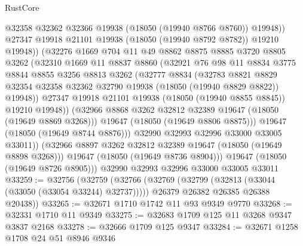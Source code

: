 \begin{lexlean}{RustCore}
\begin{coremodule}
                      @32358
                      @32362
                      @32366
                      @19938
                      (@18050 (@19940 @8766 @8760))
                      @19948))
                  @27347
                  @19918
                  @21101
                  @19938
                  (@18050 (@19940 @8792 @8782))
                  @19210
                  @19948))
              (@32276
                @1669
                @704
                @11
                @49
                @8862
                @8875
                @8885
                @3720
                @8805
                @3262
                (@32310
                  @1669
                  @11
                  @8837
                  @8860
                  (@32921
                    @76
                    @98
                    @11
                    @8834
                    @3775
                    @8844
                    @8855
                    @3256
                    @8813
                    @3262
                    (@32777
                      @8834
                      (@32783
                        @8821
                        @8829
                        @32354
                        @32358
                        @32362
                        @32790
                        @19938
                        (@18050 (@19940 @8829 @8822))
                        @19948))
                    @27347
                    @19918
                    @21101
                    @19938
                    (@18050 (@19940 @8855 @8845))
                    @19210
                    @19948))
                (@32966 @8868 @3262 @32812 @32389 @19647 (@18050 (@19649 @8869 @3268)))
                @19647
                (@18050 (@19649 @8806 @8875)))
              @19647
              (@18050 (@19649 @8744 @8876)))
            @32990
            @32993
            @32996
            @33000
            @33005
            @33011))
        (@32966 @8897 @3262 @32812 @32389 @19647 (@18050 (@19649 @8898 @3268)))
        @19647
        (@18050 (@19649 @8736 @8904)))
      @19647
      (@18050 (@19649 @8726 @8905)))
    @32990
    @32993
    @32996
    @33000
    @33005
    @33011
@33259 := @32756
    (@32759
      (@32766
        (@32769 (@32799 (@32813 (@33044 (@33050 (@33054 @33244) @32737)))))
        @26379
        @26382
        @26385
        @26388
        @20438))
@33265 := @32671 @1710 @1742 @11 @93 @9349 @9770
@33268 := @32331 @1710 @11 @9349
@33275 := @32683 @1709 @125 @11 @3268 @9347 @3837 @2168
@33278 := @32666 @1709 @125 @9347
@33284 := @32671 @1258 @1708 @24 @51 @8946 @9346

\end{coremodule}
\end{lexlean}
